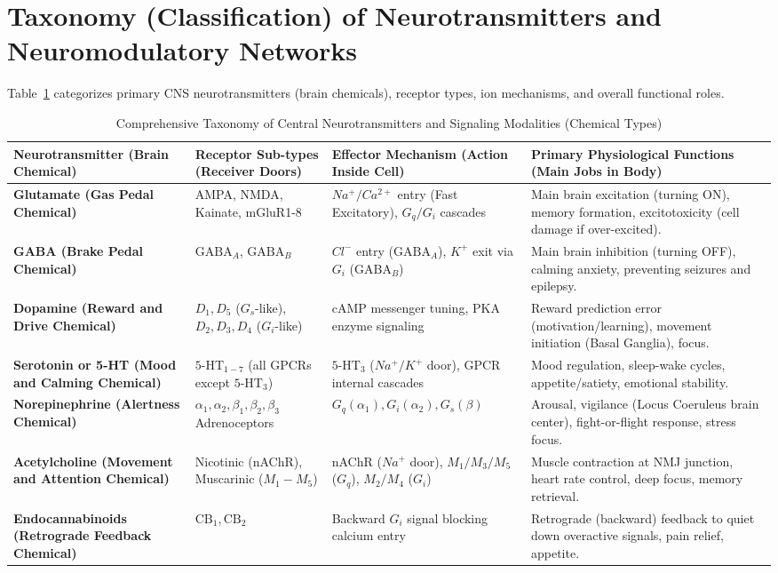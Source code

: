 \documentclass[10pt,journal,compsoc,onecolumn]{IEEEtran}
\begin{document}
\section{Taxonomy (Classification) of Neurotransmitters and Neuromodulatory Networks}
\label{sec:neurotransmitters}

Table~\ref{tab:neurotransmitter_taxonomy} categorizes primary CNS neurotransmitters (brain chemicals), receptor types, ion mechanisms, and overall functional roles.

\begin{table}[htbp]
\caption{Comprehensive Taxonomy of Central Neurotransmitters and Signaling Modalities (Chemical Types)}
\label{tab:neurotransmitter_taxonomy}
\centering
\begin{tabular}{p{2.5cm}p{3.2cm}p{3.0cm}p{4.5cm}}
\toprule
\textbf{Neurotransmitter (Brain Chemical)} & \textbf{Receptor Sub-types (Receiver Doors)} & \textbf{Effector Mechanism (Action Inside Cell)} & \textbf{Primary Physiological Functions (Main Jobs in Body)} \\
\midrule
\textbf{Glutamate (Gas Pedal Chemical)} & AMPA, NMDA, Kainate, mGluR1-8 & $Na^+/Ca^{2+}$ entry (Fast Excitatory), $G_q/G_i$ cascades & Main brain excitation (turning ON), memory formation, excitotoxicity (cell damage if over-excited). \\
\midrule
\textbf{GABA (Brake Pedal Chemical)} & $\text{GABA}_A$, $\text{GABA}_B$ & $Cl^-$ entry ($\text{GABA}_A$), $K^+$ exit via $G_i$ ($\text{GABA}_B$) & Main brain inhibition (turning OFF), calming anxiety, preventing seizures and epilepsy. \\
\midrule
\textbf{Dopamine (Reward and Drive Chemical)} & $D_1, D_5$ ($G_s$-like), $D_2, D_3, D_4$ ($G_i$-like) & cAMP messenger tuning, PKA enzyme signaling & Reward prediction error (motivation/learning), movement initiation (Basal Ganglia), focus. \\
\midrule
\textbf{Serotonin or 5-HT (Mood and Calming Chemical)} & $5\text{-HT}_{1-7}$ (all GPCRs except $5\text{-HT}_3$) & $5\text{-HT}_3$ ($Na^+/K^+$ door), GPCR internal cascades & Mood regulation, sleep-wake cycles, appetite/satiety, emotional stability. \\
\midrule
\textbf{Norepinephrine (Alertness Chemical)} & $\alpha_1, \alpha_2, \beta_1, \beta_2, \beta_3$ Adrenoceptors & $G_q (\alpha_1), G_i (\alpha_2), G_s (\beta)$ & Arousal, vigilance (Locus Coeruleus brain center), fight-or-flight response, stress focus. \\
\midrule
\textbf{Acetylcholine (Movement and Attention Chemical)} & Nicotinic (nAChR), Muscarinic ($M_1-M_5$) & nAChR ($Na^+$ door), $M_1/M_3/M_5$ ($G_q$), $M_2/M_4$ ($G_i$) & Muscle contraction at NMJ junction, heart rate control, deep focus, memory retrieval. \\
\midrule
\textbf{Endocannabinoids (Retrograde Feedback Chemical)} & $\text{CB}_1, \text{CB}_2$ & Backward $G_i$ signal blocking calcium entry & Retrograde (backward) feedback to quiet down overactive signals, pain relief, appetite. \\
\bottomrule
\end{tabular}
\end{table}
\end{document}
